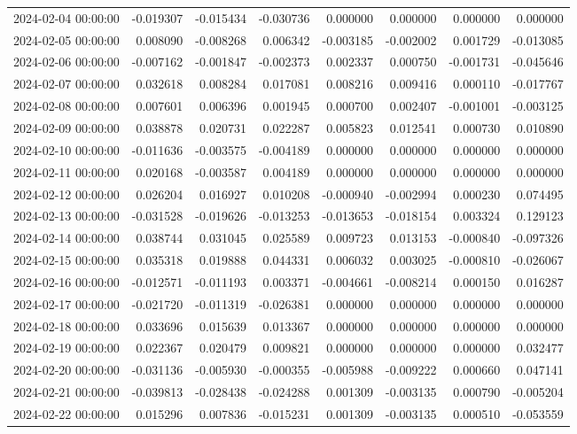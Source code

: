 \begin{tabular}{lrrrrrrr}
2024-02-04 00:00:00 & -0.019307 & -0.015434 & -0.030736 & 0.000000 & 0.000000 & 0.000000 & 0.000000 \\
2024-02-05 00:00:00 & 0.008090 & -0.008268 & 0.006342 & -0.003185 & -0.002002 & 0.001729 & -0.013085 \\
2024-02-06 00:00:00 & -0.007162 & -0.001847 & -0.002373 & 0.002337 & 0.000750 & -0.001731 & -0.045646 \\
2024-02-07 00:00:00 & 0.032618 & 0.008284 & 0.017081 & 0.008216 & 0.009416 & 0.000110 & -0.017767 \\
2024-02-08 00:00:00 & 0.007601 & 0.006396 & 0.001945 & 0.000700 & 0.002407 & -0.001001 & -0.003125 \\
2024-02-09 00:00:00 & 0.038878 & 0.020731 & 0.022287 & 0.005823 & 0.012541 & 0.000730 & 0.010890 \\
2024-02-10 00:00:00 & -0.011636 & -0.003575 & -0.004189 & 0.000000 & 0.000000 & 0.000000 & 0.000000 \\
2024-02-11 00:00:00 & 0.020168 & -0.003587 & 0.004189 & 0.000000 & 0.000000 & 0.000000 & 0.000000 \\
2024-02-12 00:00:00 & 0.026204 & 0.016927 & 0.010208 & -0.000940 & -0.002994 & 0.000230 & 0.074495 \\
2024-02-13 00:00:00 & -0.031528 & -0.019626 & -0.013253 & -0.013653 & -0.018154 & 0.003324 & 0.129123 \\
2024-02-14 00:00:00 & 0.038744 & 0.031045 & 0.025589 & 0.009723 & 0.013153 & -0.000840 & -0.097326 \\
2024-02-15 00:00:00 & 0.035318 & 0.019888 & 0.044331 & 0.006032 & 0.003025 & -0.000810 & -0.026067 \\
2024-02-16 00:00:00 & -0.012571 & -0.011193 & 0.003371 & -0.004661 & -0.008214 & 0.000150 & 0.016287 \\
2024-02-17 00:00:00 & -0.021720 & -0.011319 & -0.026381 & 0.000000 & 0.000000 & 0.000000 & 0.000000 \\
2024-02-18 00:00:00 & 0.033696 & 0.015639 & 0.013367 & 0.000000 & 0.000000 & 0.000000 & 0.000000 \\
2024-02-19 00:00:00 & 0.022367 & 0.020479 & 0.009821 & 0.000000 & 0.000000 & 0.000000 & 0.032477 \\
2024-02-20 00:00:00 & -0.031136 & -0.005930 & -0.000355 & -0.005988 & -0.009222 & 0.000660 & 0.047141 \\
2024-02-21 00:00:00 & -0.039813 & -0.028438 & -0.024288 & 0.001309 & -0.003135 & 0.000790 & -0.005204 \\
2024-02-22 00:00:00 & 0.015296 & 0.007836 & -0.015231 & 0.001309 & -0.003135 & 0.000510 & -0.053559 \\

\end{tabular}
